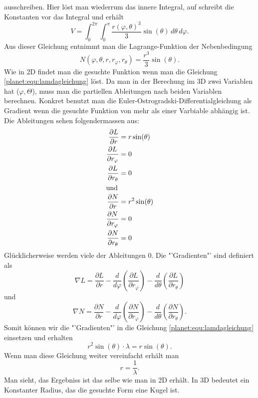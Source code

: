ausschreiben.
Hier löst man wiederrum das innere Integral, auf schreibt die Konstanten vor das Integral und erhält
\begin{equation*}
	V = \int_{0}^{2\pi}\int_{0}^{\pi}\frac{r(\varphi,\theta)^3}{3} \sin (\theta) \, d\theta \, d\varphi.
\end{equation*}
Aus dieser Gleichung entnimmt man die Lagrange-Funktion der Nebenbedingung
\begin{equation*}
	N(\varphi,\theta ,r,r_\varphi,r_\theta) = \frac{r^3}{3} \sin (\theta).
\end{equation*}
Wie in 2D findet man die gesuchte Funktion wenn man die Gleichung \eqref{planet:equ:lamdagleichung} löst.
Da man in der Berechung im 3D zwei Variablen hat (\(\varphi,\Theta\)), muss man die partiellen Ableitungen nach beiden Variablen berechnen.
Konkret benutzt man die Euler-Ostrogradski-Differentialgleichung als Gradient wenn die gesuchte Funktion von mehr als einer Varbiable abhängig ist.
Die Ableitungen sehen folgendermassen aus:
\begin{align*}
	\frac{\partial L}{\partial r} &= r  \sin (\theta) \\
	\frac{\partial L}{\partial r_\varphi} &= 0 \\
	\frac{\partial L}{\partial r_\theta} &= 0 \\
\intertext{und}
	\frac{\partial N}{\partial r} &= r^2\sin (\theta) \\
	\frac{\partial N}{\partial r_\varphi} &= 0 \\
	\frac{\partial N}{\partial r_\theta} &= 0
\end{align*}
Glücklicherweise werden viele der Ableitungen 0.
Die "'Gradienten"' sind definiert als
\begin{equation*}
	\nabla L =  \frac{\partial L}{\partial r} 
	-\frac{d}{d\varphi}\left( \frac{\partial L}{\partial r_\varphi} \right)
	-\frac{d}{d\theta}\left( \frac{\partial L}{\partial r_\theta} \right)
\end{equation*}
und
\begin{equation*}
	\nabla N=  \frac{\partial N}{\partial r} 
	-\frac{d}{d\varphi}\left( \frac{\partial N}{\partial r_\varphi} \right)
	-\frac{d}{d\theta}\left( \frac{\partial N}{\partial r_\theta} \right).
\end{equation*}
Somit können wir die "'Gradienten"' in die Gleichung \eqref{planet:equ:lamdagleichung} einsetzen und erhalten
\begin{equation*}
	r^2\sin (\theta) \cdot \lambda = r \sin (\theta).
\end{equation*}
Wenn man diese Gleichung weiter vereinfacht erhält man
\begin{equation*}
	r = \frac{1}{\lambda}.
\end{equation*}
Man sieht, das Ergebniss ist das selbe wie man in 2D erhält.
In 3D bedeutet ein Konstanter Radius, das die gesuchte Form eine Kugel ist.


